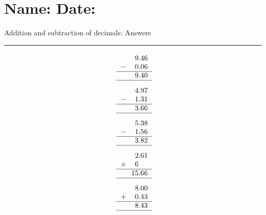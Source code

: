 \documentclass[leqno, 12pt]{article}
\def \HeadingAnswers {\section*{\Large Name: \underline{\hspace{8cm}} \hfill Date: \underline{\hspace{3cm}}} \vspace{-3mm}
{Addition and subtraction of decimals: Answers} \vspace{1pt}\hrule}
\begin{document}
\HeadingAnswers
\vspace{-5mm}
\begin{multicols}{3}
\begin{equation}
    \raisebox{-0.8cm}{
        \begin{tabular}{c S[table-format=1.2]}
         &9.46 \tabularnewline
        $-$&0.06 \tabularnewline
        \hline
         &9.40 \tabularnewline
        \hline
    \end{tabular}}
\end{equation}
\vspace{-1pt}%
\begin{equation}
    \raisebox{-0.8cm}{
        \begin{tabular}{c S[table-format=1.2]}
         &4.97 \tabularnewline
        $-$&1.31 \tabularnewline
        \hline
         &3.66 \tabularnewline
        \hline
    \end{tabular}}
\end{equation}
\vspace{-1pt}%
\begin{equation}
    \raisebox{-0.8cm}{
        \begin{tabular}{c S[table-format=1.2]}
         &5.38 \tabularnewline
        $-$&1.56 \tabularnewline
        \hline
         &3.82 \tabularnewline
        \hline
    \end{tabular}}
\end{equation}
\vspace{-1pt}%
\begin{equation}
    \raisebox{-0.8cm}{
        \begin{tabular}{c S[table-format=1.2]}
         &2.61 \tabularnewline
        $\times$&6 \tabularnewline
        \hline
         &15.66 \tabularnewline
        \hline
    \end{tabular}}
\end{equation}
\vspace{-1pt}%
\begin{equation}
    \raisebox{-0.8cm}{
        \begin{tabular}{c S[table-format=1.2]}
         &8.00 \tabularnewline
        $+$&0.43 \tabularnewline
        \hline
         &8.43 \tabularnewline
        \hline
    \end{tabular}}
\end{equation}
\vspace{-1pt}%
\begin{equation}

\end{equation}
\end{multicols}
\end{document}
